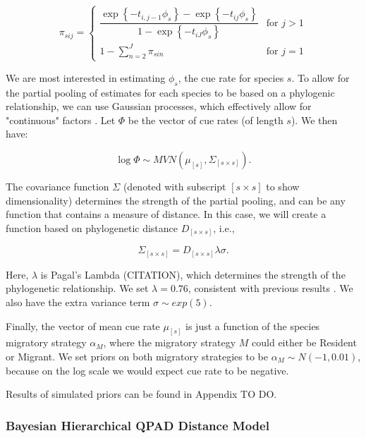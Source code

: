 \documentclass[12pt]{article}
\begin{document}
\begin{equation*}
	\pi_{sij} = 
	\begin{cases}
		\dfrac{\exp\left\{ -t_{i,j-1}\phi_{s} \right\} - \exp\left\{ -t_{ij}\phi_{s} \right\}}{1 - \exp\left\{ -t_{iJ}\phi_{s} \right\}} & \text{for } j > 1 \\
		1 - \sum_{n = 2}^{J} \pi_{sin} & \text{for } j = 1
	\end{cases}
\end{equation*}

\par We are most interested in estimating $\phi_s$, the cue rate for species $s$. 
To allow for the partial pooling of estimates for each species to be based on a phylogenic relationship, we can use Gaussian processes, which effectively allow for "continuous" factors \citep{bernardo_regression_1998, mcelreath_continous_2020}. 
Let $\Phi$ be the vector of cue rates (of length $s$). 
We then have:

$$\log \Phi \sim MVN\left( \mu_{[s]}, \Sigma_{[s \times s]} \right).$$

\par The covariance function $\Sigma$ (denoted with subscript $[s \times s]$ to show dimensionality) determines the strength of the partial pooling, and can be any function that contains a measure of distance. 
In this case, we will create a function based on phylogenetic distance $D_{[s \times s]}$, i.e.,

$$\Sigma_{[s \times s]} = D_{[s \times s]}\lambda\sigma.$$

\par Here, $\lambda$ is Pagal's Lambda (CITATION), which determines the strength of the phylogenetic relationship. 
We set $\lambda = 0.76$, consistent with previous results \cite{solymos_phylogeny_2018}. 
We also have the extra variance term $\sigma \sim exp(5)$.

\par Finally, the vector of mean cue rate $\mu_{[s]}$ is just a function of the species migratory strategy $\alpha_M$, where the migratory strategy $M$ could either be Resident or Migrant. 
We set priors on both migratory strategies to be $\alpha_M \sim N(-1, 0.01)$, because on the log scale we would expect cue rate to be negative. 

\par Results of simulated priors can be found in Appendix TO DO.

\subsubsection{Bayesian Hierarchical QPAD Distance Model}
\end{document}
